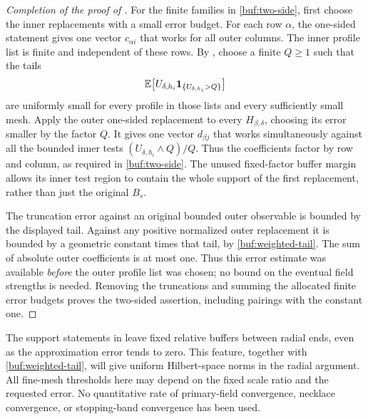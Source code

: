\begin{proof}[Completion of the proof of ]
For the finite families in \eqref{buf:two-side}, first choose the inner
replacements with a small error budget.  For each row $\alpha$, the
one-sided statement gives one vector $c_{\alpha i}$ that works for all
outer columns.  The inner profile list is finite and independent of
these rows.  By
, choose a finite $Q\ge1$ such that the tails
\[
 \mathbb E\bigl[U_{\delta,h_i}
                \mathbf 1_{\{U_{\delta,h_i}>Q\}}\bigr]
\]
are uniformly small for every profile in those lists and every
sufficiently small mesh.  Apply the outer one-sided replacement to
every $H_{\beta,\delta}$, choosing its error smaller by the factor $Q$.
It gives one vector $d_{\beta j}$ that works simultaneously against all
the bounded inner tests $(U_{\delta,h_i}\wedge Q)/Q$.  Thus the
coefficients factor by row and column, as required in
\eqref{buf:two-side}.  The unused fixed-factor buffer margin
allows its inner test region to contain the whole support of the
first replacement, rather than just the original $B_s$.

The truncation error against an original bounded outer observable
is bounded by the displayed tail.  Against any positive normalized
outer replacement it is bounded by a geometric constant times that
tail, by \eqref{buf:weighted-tail}.  The sum of absolute outer
coefficients is at most one.  Thus this error estimate was available
\emph{before} the outer profile list was chosen; no bound on the
eventual field strengths is needed.  Removing the truncations and
summing the allocated finite error budgets proves the two-sided
assertion, including pairings with the constant one.
\end{proof}

The support statements in  leave fixed relative
buffers between radial ends, even as the approximation error tends
to zero.  This feature, together with
\eqref{buf:weighted-tail}, will give uniform Hilbert-space norms in
the radial argument.  All fine-mesh thresholds here may depend on
the fixed scale ratio and the requested error.  No quantitative rate
of primary-field convergence, necklace convergence, or stopping-band
convergence has been used.

